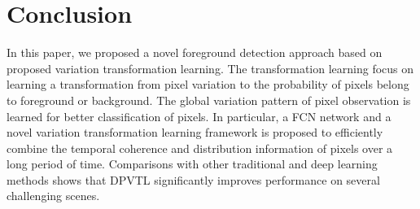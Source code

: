 \documentclass[journal]{IEEEtran}
\begin{document}




\section{Conclusion}
\label{sec6}
In this paper, we proposed a novel foreground detection approach based on proposed variation transformation learning.
%
The transformation learning focus on learning a transformation from pixel variation to the probability of pixels belong to foreground or background.
%
The global variation pattern of pixel observation is learned for better classification of pixels.
%
In particular, a FCN network and a novel variation transformation learning framework is proposed to efficiently combine the temporal coherence and distribution information of pixels over a long period of time. 
%
Comparisons with other traditional and deep learning methods shows that DPVTL significantly improves performance on several challenging scenes.

% 


\ifCLASSOPTIONcaptionsoff
  \newpage
\fi

  
  
\end{document}
